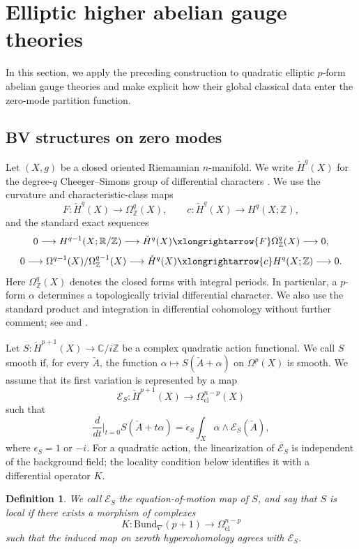 \documentclass[12pt]{amsart}
\numberwithin{table}{section}
\numberwithin{equation}{section}
\newtheorem{defn}{Definition}[section]
\theoremstyle{plain}
\newcommand{\sE}{\mathcal{E}}
\newcommand{\R}{\mathbb{R}}
\newcommand{\C}{\mathbb{C}}
\newcommand{\Z}{\mathbb{Z}}
\begin{document}
\section{Elliptic higher abelian gauge theories}

In this section, we apply the preceding construction to quadratic elliptic $p$-form abelian gauge theories and make explicit how their global classical data enter the zero-mode partition function. 

\subsection{BV structures on zero modes}

Let $(X,g)$ be a closed oriented Riemannian $n$-manifold. We write $\check H^q(X)$ for the degree-$q$ Cheeger--Simons group of differential characters \cite{CheegerSimons}. We use the curvature and characteristic-class maps
\[
F:\check H^q(X)\longrightarrow\Omega^q_{\Z}(X),
\qquad
c:\check H^q(X)\longrightarrow H^q(X;\Z),
\]
and the standard exact sequences
\[
0\longrightarrow H^{q-1}(X;\R/\Z)\longrightarrow\check H^q(X)
\xlongrightarrow{F}\Omega^q_{\Z}(X)\longrightarrow0,
\]
\[
0\longrightarrow\Omega^{q-1}(X)/\Omega^{q-1}_{\Z}(X)
\longrightarrow\check H^q(X)\xlongrightarrow{c}H^q(X;\Z)\longrightarrow0.
\]
Here $\Omega^q_{\Z}(X)$ denotes the closed forms with integral periods. In particular, a $p$-form $\alpha$ determines a topologically trivial differential character. We also use the standard product and integration in differential cohomology without further comment; see \cite{CheegerSimons} and \cite[Appendix~A]{BelovMoore}. 

Let $S: \check H^{p+1}(X) \rightarrow \C/i\Z$ be a complex quadratic action functional. We call $S$ smooth if, for every $\check A$, the function $\alpha\mapsto S(\check A+\alpha)$ on $\Omega^p(X)$ is smooth. We assume that its first variation is represented by a map
\[
\sE_S: \check H^{p+1}(X) \rightarrow \Omega^{n-p}_{\mathrm{cl}}(X)
\]
such that
\[
\frac{d}{dt} \bigg|_{t=0} S(\check A+t\alpha)
= \epsilon_S \int_X \alpha \wedge \sE_S(\check A),
\]
where $\epsilon_S=1$ or $-i$. For a quadratic action, the linearization of $\sE_S$ is independent of the background field; the locality condition below identifies it with a differential operator $K$.

\begin{defn}
	We call $\sE_S$ the \emph{equation-of-motion} map of $S$, and say that $S$ is \emph{local} if there exists a morphism of complexes
	\[
	K\colon \mathrm{Bund}_\nabla(p+1)
	\longrightarrow
	\Omega_{\mathrm{cl}}^{n-p}
	\]
	such that the induced map on zeroth hypercohomology agrees with $\sE_S$.
\end{defn}
\end{document}
